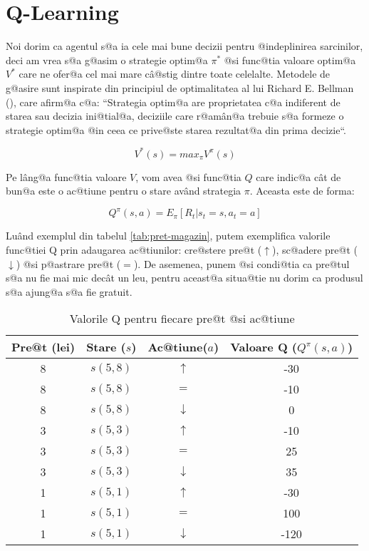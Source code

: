 \section{Q-Learning}

Noi dorim ca agentul s@a ia cele mai bune decizii pentru @indeplinirea sarcinilor, deci am vrea s@a g@asim o strategie optim@a $\pi^*$ @si func@tia valoare optim@a $V^{*}$ care ne ofer@a cel mai mare c\^ a@stig dintre toate celelalte. Metodele de g@asire sunt inspirate din principiul de optimalitatea al lui Richard E. Bellman (\cite{bellman-theory}), care afirm@a c@a: ``Strategia optim@a are proprietatea c@a indiferent de starea sau decizia ini@tial@a, deciziile care r@am\^ an@a trebuie s@a formeze o strategie optim@a @in ceea ce prive@ste starea rezultat@a din prima decizie``.  

\begin{equation}
	V^{*}(s) = max_{\pi} V^{\pi}(s)
\end{equation}

Pe l\^ ang@a func@tia valoare $V$, vom avea @si func@tia $Q$ care indic@a c\^ at de bun@a este o ac@tiune pentru o stare av\^and strategia $\pi$. Aceasta este de forma:

\begin{equation}
	Q^{\pi}(s, a) = E_{\pi} \left[ R_t | s_t = s, a_t = a \right]
\end{equation}

Lu\^and exemplul din tabelul \ref{tab:pret-magazin}, putem exemplifica valorile func@tiei Q prin adaugarea ac@tiunilor: cre@stere pre@t ($\uparrow$), sc@adere pre@t ($\downarrow$) @si p@astrare pre@t ($=$). De asemenea, punem @si condi@tia ca pre@tul s@a nu fie mai mic dec\^at un leu, pentru aceast@a situa@tie nu dorim ca produsul s@a ajung@a s@a fie gratuit.

\begin{table}[h]
	\begin{center}
		\begin{tabular}{|c|c|c|c|}
			\hline
			Pre@t (lei) & Stare ($s$) & Ac@tiune($a$) & Valoare Q ($Q^{\pi}(s, a)$) \\
			\hline
			8 & $s(5,8)$ & $\uparrow$ & -30 \\ 
			\hline
			8 & $s(5,8)$ & $=$ & -10 \\
			\hline
			8 & $s(5,8)$ & $\downarrow$ & 0 \\
			\hline
			3 & $s(5,3)$ & $\uparrow$ & -10 \\ 
			\hline
			3 & $s(5,3)$ & $=$ & 25 \\
			\hline
			3 & $s(5,3)$ & $\downarrow$ & 35 \\
			\hline
			1 & $s(5,1)$ & $\uparrow$ & -30 \\ 
			\hline
			1 & $s(5,1)$ & $=$ & 100 \\
			\hline
			1 & $s(5,1)$ & $\downarrow$ & -120 \\
			\hline
		\end{tabular}
	\end{center}
	\caption{Valorile Q pentru fiecare pre@t @si ac@tiune}
	\label{tab:pret-magazin-q}
\end{table}

